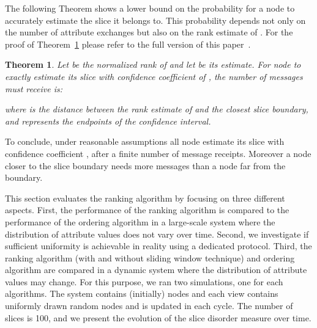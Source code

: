 \documentclass[times,10pt,twocolumn]{article}
\newtheorem{theorem}{Theorem}[section]
\begin{document}
\label{sec:analysis2}

The following Theorem shows a lower bound on the probability 
for a node  to accurately estimate the slice it belongs to.
This probability depends not only on the number of attribute exchanges
but also on the rank estimate of .
For the proof of Theorem~\ref{thm:toprove} please refer to the full version of this paper~\cite{FGJKR06b}.

\begin{theorem}\label{thm:toprove}
Let  be the normalized rank of  and let  be its estimate.
For node  to exactly estimate its slice with confidence coefficient of 
, the number of messages  must receive is:

\noindent
where  is the distance between the rank estimate of  and 
the closest slice boundary, and  represents the endpoints of the 
confidence interval.  
\end{theorem}


To conclude, under reasonable assumptions all node estimate its slice with confidence coefficient , after a finite number of message receipts. 
Moreover a node closer to the slice boundary needs more messages than a node far from the boundary.


This section evaluates the ranking algorithm by focusing on three
different aspects.  
First, the performance of the ranking algorithm is
compared to the performance of the ordering algorithm
in a large-scale system where the distribution 
of attribute values does not vary over time.
Second, we investigate if sufficient uniformity is achievable in reality using a dedicated 
protocol.
Third, the ranking algorithm (with and without sliding window technique) and ordering algorithm are compared in 
a dynamic system where the distribution of attribute values may 
change.
For this purpose, we ran two simulations, one for each algorithms.
The system contains (initially)  nodes and each view contains  uniformly drawn random 
nodes and is updated in each cycle.
The number of slices is 100, and we present the evolution of the slice disorder measure
over time.
\end{document}
